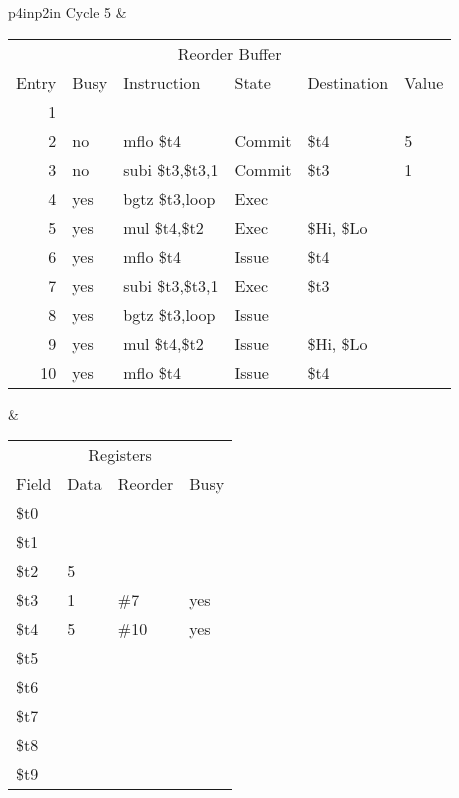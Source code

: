 \noindent
\begin{tabular}{p{4in}p{2in}}
Cycle 5 & \\ \hline \hline

\begin{tabular}{rlp{.9in}lll}
\multicolumn{6}{c}{Reorder Buffer} \\
Entry & Busy & Instruction        & State & Destination & Value \\ \hline
 1    &      &                    &       &             &       \\
 2    & no   & mflo \$t4          & Commit& \$t4        & 5     \\
 3    & no   & subi \$t3,\$t3,1   & Commit& \$t3        & 1     \\
 4    & yes  & bgtz \$t3,loop     & Exec  &             &       \\
 5    & yes  & mul  \$t4,\$t2     & Exec  & \$Hi, \$Lo  &       \\
 6    & yes  & mflo \$t4          & Issue & \$t4        &       \\
 7    & yes  & subi \$t3,\$t3,1   & Exec  & \$t3        &       \\
 8    & yes  & bgtz \$t3,loop     & Issue &             &       \\
 9    & yes  & mul  \$t4,\$t2     & Issue & \$Hi, \$Lo  &       \\
10    & yes  & mflo \$t4          & Issue & \$t4        &       \\
\end{tabular} &

\begin{tabular}{llll}
\multicolumn{4}{c}{Registers} \\
Field & Data & Reorder & Busy \\ \hline
\$t0  &      &         &      \\
\$t1  &      &         &      \\
\$t2  & 5    &         &      \\
\$t3  & 1    & \#7     & yes  \\
\$t4  & 5    & \#10     & yes  \\
\$t5  &      &         &      \\
\$t6  &      &         &      \\
\$t7  &      &         &      \\
\$t8  &      &         &      \\
\$t9  &      &         &      \\
\end{tabular} \\


\end{tabular}
